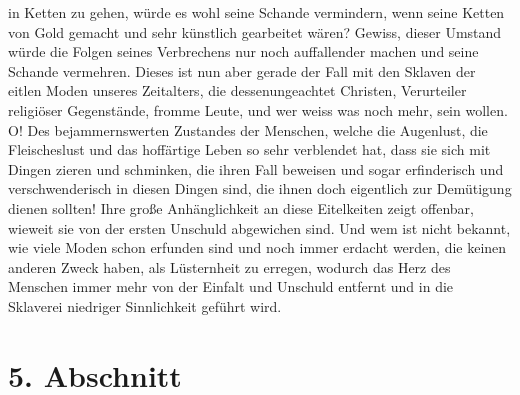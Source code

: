 in Ketten zu gehen, würde es wohl seine Schande vermindern, wenn seine Ketten
von Gold gemacht und sehr künstlich gearbeitet wären? Gewiss, dieser
Umstand
würde die Folgen seines Verbrechens nur noch auffallender machen und seine
Schande vermehren. Dieses ist nun aber gerade der Fall mit den
Sklaven der
eitlen Moden unseres Zeitalters, die dessenungeachtet Christen, Verurteiler
religiöser Gegenstände, fromme Leute, und wer weiss was noch mehr, sein wollen.
O! Des bejammernswerten Zustandes der Menschen, welche die Augenlust, die
Fleischeslust und das hoffärtige Leben so sehr verblendet
hat, dass sie sich mit
Dingen zieren und schminken, die ihren Fall beweisen und sogar
erfinderisch und
verschwenderisch in diesen Dingen sind, die ihnen doch eigentlich zur
Demütigung dienen sollten! Ihre große Anhänglichkeit an diese
Eitelkeiten
zeigt offenbar, wieweit sie von der ersten Unschuld abgewichen
sind. Und wem ist
nicht bekannt, wie viele Moden schon erfunden sind und noch immer
erdacht
werden, die keinen anderen Zweck haben, als Lüsternheit zu erregen, wodurch das
Herz des Menschen immer mehr von der Einfalt und Unschuld entfernt und in die
Sklaverei niedriger Sinnlichkeit geführt wird.

\section{5. Abschnitt} \label{kap14_ab5}

